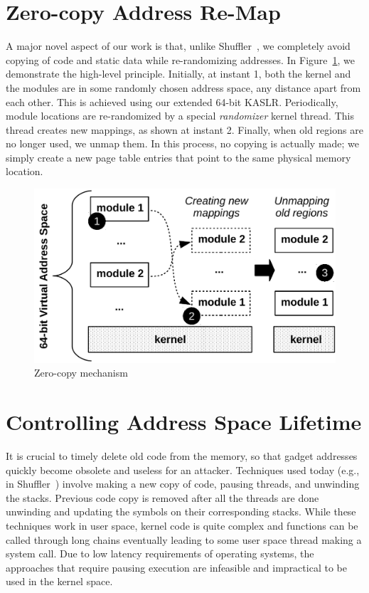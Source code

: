 \section{Zero-copy Address Re-Map}
A major novel aspect of our work is that, unlike Shuffler~\cite{SHUFFLER}, we completely avoid copying of code and static data while re-randomizing addresses.
In Figure~\ref{fig:architecture}, we demonstrate the high-level principle.
Initially, at instant 1, both the kernel and the modules are in some randomly chosen address space, any distance apart from each other. This is achieved using our extended 64-bit KASLR. Periodically, module locations are re-randomized by a special \textit{randomizer} kernel thread. This thread creates new mappings, as shown at instant 2. Finally, when old regions are no longer used, we unmap them. In this process, no copying is actually made; we simply create a new page table entries that point to the same physical memory location.

\begin{figure}[ht!]
\centering
\includegraphics[width=0.7\columnwidth]{pictures/architecture.pdf}
\caption{Zero-copy mechanism~\cite{Adelie}}
\label{fig:architecture}
\end{figure}

\section{Controlling Address Space Lifetime}
It is crucial to timely delete old code from the memory, so that gadget addresses quickly become obsolete and useless for an attacker. Techniques used today (e.g., in Shuffler~\cite{SHUFFLER}) involve making a new copy of code, pausing threads, and unwinding the stacks. Previous code copy is removed after all the threads are done unwinding and updating the symbols on their corresponding stacks. While these techniques work in user space, kernel code is quite complex and functions can be called through long chains eventually leading to some user space thread making a system call. Due to low latency requirements of operating systems, the approaches that require pausing execution are infeasible and impractical to be used in the kernel space.


